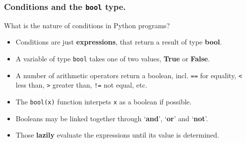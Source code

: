 \documentclass{beamer} %
\newcommand\emc[1]{\textcolor{brightblue}{\textbf{#1}}}
\begin{document}
\begin{frame}

\frametitle{Conditions and the \texttt{bool} type.} 

What is the nature of conditions in Python programs?
\begin{itemize}
\item Conditions are just \emc{expressions}, that return a result of type \emc{bool}.
\item A variable of type \texttt{bool} takes one of two values, \emc{True} or \emc{False}.
\item A number of arithmetic operators return a boolean, incl. \texttt{==} for equality, \texttt{<} less than, \texttt{>} greater than, \texttt{!=} not equal, etc.
\item The \texttt{bool(x)} function interpets \texttt{x} as a boolean if possible.
\item Booleans may be linked together through `\emc{and}', `\emc{or}' and `\emc{not}'.
\item Those \emc{lazily} evaluate the expressions until its value is determined.
\end{itemize}

\end{frame}


\end{document}
